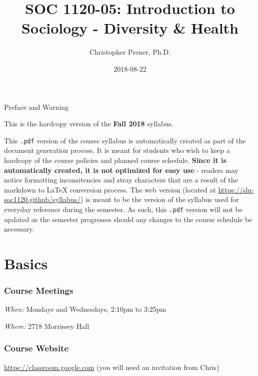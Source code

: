 \documentclass[]{book}
\title{SOC 1120-05: Introduction to Sociology - Diversity \& Health}
\author{Christopher Prener, Ph.D.}
\date{2018-08-22}
\theoremstyle{definition}
\theoremstyle{definition}
\theoremstyle{definition}
\theoremstyle{remark}
\begin{document}
\maketitle

\begin{center}
{\huge Preface and Warning} \\
\end{center}
\vspace{5mm}
This is the hardcopy version of the \textbf{Fall 2018} syllabus.
\vspace{5mm}
\par \noindent This \texttt{.pdf} version of the course syllabus is automatically created as part of the document generation process. It is meant for students who wish to keep a hardcopy of the course policies and planned course schedule. \textbf{Since it is automatically created, it is not optimized for easy use} - readers may notice formatting inconsitencies and stray characters that are a result of the markdown to \LaTeX{} conversion process. The web version (located at \href{https://slu-soc1120.github/syllabus/}{https://slu-soc1120.github/syllabus/}) is meant to be the version of the syllabus used for everyday reference during the semester. As such, this \texttt{.pdf} version will not be updated as the semester progresses should any changes to the course schedule be necessary.

\hypertarget{basics}{%
\chapter*{Basics}\label{basics}}

\hypertarget{course-meetings}{%
\subsection*{Course Meetings}\label{course-meetings}}

\emph{When:} Mondays and Wednesdays, 2:10pm to 3:25pm

\emph{Where:} 2718 Morrissey Hall

\hypertarget{course-website}{%
\subsection*{Course Website}\label{course-website}}

\url{https://classroom.google.com} (you will need an invitation from
Chris)
\end{document}
